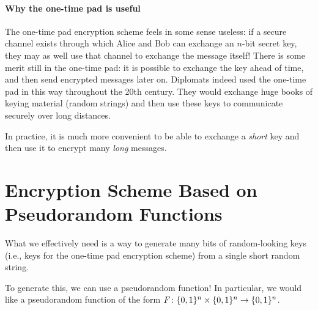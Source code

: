 \paragraph{Why the one-time pad is useful}
The one-time pad encryption scheme feels in some sense useless: if a secure channel exists through which Alice and Bob can exchange an $n$-bit secret key, they may as well use that channel to exchange the message itself!
There is some merit still in the one-time pad: it is possible
to exchange the key ahead of time, and then send encrypted messages
later on.
Diplomats indeed used the one-time pad in this way throughout the 20th century.
They would exchange huge books of keying material (random strings) 
and then use these keys to communicate securely over long distances.

In practice, it is much more convenient to be able to exchange a \emph{short}
key and then use it to encrypt many \emph{long} messages.

\section{Encryption Scheme Based on Pseudorandom Functions}\label{sec:lec8:weakenc}
What we effectively need is a way to generate many bits of random-looking keys 
(i.e., keys for the one-time pad encryption scheme)
from a single short random string.

To generate this, we can use a pseudorandom function! 
In particular, we would like a pseudorandom 
function of the form $F \colon \{0,1\}^n \times \{0,1\}^n \rightarrow \{0,1\}^n$. 

